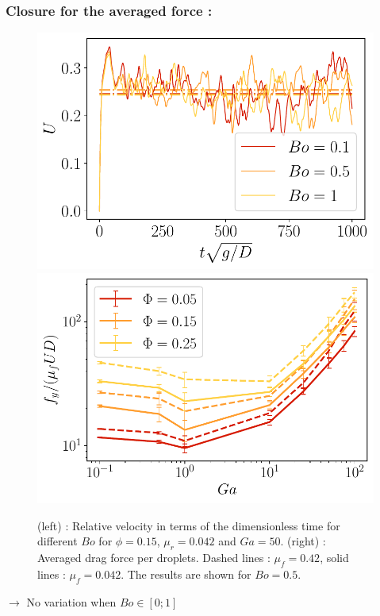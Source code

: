 \documentclass[aspectratio=169]{beamer}
\begin{document}
\begin{frame}
  \frametitle{Closure for the averaged force :}
  \begin{figure}[h!]
    \centering
    \includegraphics[height=0.5\textheight]{image/N_10/Favg/Bosdep_Ga_50.pdf}
    \includegraphics[height=0.5\textheight]{image/N_10/Favg/F_mu_Bo_0_5.pdf}
    \caption{(left) : Relative velocity in terms of the dimensionless time for different $Bo$ for $\phi = 0.15$, $\mu_r = 0.042$ and $Ga = 50$. (right) : Averaged drag force per droplets. Dashed lines : $\mu_f = 0.42$, solid lines : $\mu_f = 0.042$. The results are shown for $Bo = 0.5$.} 
    \label{fig:avgF}
\end{figure}
$\rightarrow$ No variation when $Bo\in[0;1]$
\end{frame}
\end{document}
